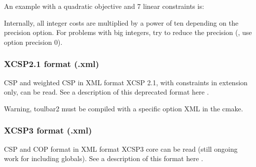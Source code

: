 \documentclass[letterpaper,10pt,openany,oneside,english]{sphinxmanual}
\begin{document}
\sphinxAtStartPar
An example with a quadratic objective and 7 linear constraints is:

\begin{sphinxVerbatim}[commandchars=\\\{\}]
      
     
     
     
     
     
     
         
\end{sphinxVerbatim}

\sphinxAtStartPar
Internally, all integer costs are multiplied by a power of ten depending on the \sphinxhyphen{}precision option.
For problems with big integers, try to reduce the precision (, use option \sphinxhyphen{}precision 0).

\sphinxstepscope


\subsubsection{XCSP2.1 format (.xml)}
\label{\detokenize{formats/xmlformat:xcsp2-1-format-xml}}\label{\detokenize{formats/xmlformat:xml-format}}\label{\detokenize{formats/xmlformat::doc}}
\sphinxAtStartPar
CSP and weighted CSP in XML format XCSP 2.1, with constraints in extension only, can be read. See a description of this deprecated format here .

\sphinxAtStartPar
Warning, toulbar2 must be compiled with a specific option XML in the cmake.


\subsubsection{XCSP3 format (.xml)}
\label{\detokenize{formats/xmlformat:xcsp3-format-xml}}
\sphinxAtStartPar
CSP and COP format in XML format XCSP3 core can be read (still on\sphinxhyphen{}going work for including globals). See a description of this format here .
\end{document}
